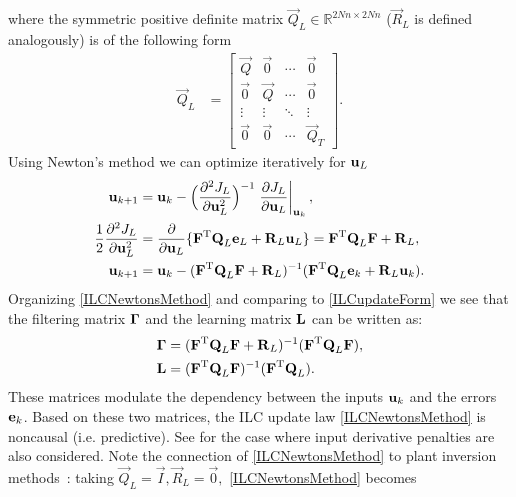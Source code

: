 \noindent where the symmetric positive definite matrix $\vec{Q}_L \in \mathbb{R}^{2Nn \times 2Nn}$ ($\vec{R}_L$ is defined analogously) is of the following form
%
\begin{equation}
\begin{aligned}
 \vec{Q}_L &= 
 \begin{bmatrix}
  \vec{Q} & \vec{0} & \cdots & \vec{0} \\
  \vec{0} & \vec{Q} & \cdots & \vec{0} \\
  \vdots  & \vdots  & \ddots & \vdots  \\
  \vec{0} & \vec{0} & \cdots & \vec{Q}_T
 \end{bmatrix}.
\end{aligned}
\label{Qmatrix}
\end{equation}
%
\noindent Using Newton's method we can optimize iteratively for $\boldsymbol{\mathrm{u}}_L$
%
\begin{equation}
\begin{aligned}
\boldsymbol{\mathrm{u}}_{k+1} &= \boldsymbol{\mathrm{u}}_k - \Big(\frac{\partial^{2}J_L}{\partial\boldsymbol{\mathrm{u}}^{2}_L}\Big)^{-1}\left.\frac{\partial{J_L}}{\partial{\boldsymbol{\mathrm{u}}_L}}\right|_{\boldsymbol{\mathrm{u}}_k}, \\
\frac{1}{2}\frac{\partial^{2}J_L}{\partial\boldsymbol{\mathrm{u}}^{2}_L} &= \frac{\partial}{\partial\boldsymbol{\mathrm{u}}_L}\{\boldsymbol{\mathrm{F}}^{\mathrm{T}}\boldsymbol{\mathrm{Q}}_L\boldsymbol{\mathrm{e}}_L + \boldsymbol{\mathrm{R}}_L\boldsymbol{\mathrm{u}}_L\} = \boldsymbol{\mathrm{F}}^{\mathrm{T}}\boldsymbol{\mathrm{Q}}_L\boldsymbol{\mathrm{F}} + \boldsymbol{\mathrm{R}}_L, \\
\boldsymbol{\mathrm{u}}_{k+1} &= \boldsymbol{\mathrm{u}}_k - (\boldsymbol{\mathrm{F}}^{\mathrm{T}}\boldsymbol{\mathrm{Q}}_L\boldsymbol{\mathrm{F}} + \boldsymbol{\mathrm{R}}_L)^{-1}(\boldsymbol{\mathrm{F}}^{\mathrm{T}}\boldsymbol{\mathrm{Q}}_L\boldsymbol{\mathrm{e}}_k + \boldsymbol{\mathrm{R}}_L\boldsymbol{\mathrm{u}}_k).
\end{aligned}
\label{ILCNewtonsMethod}
\end{equation}
%
\noindent Organizing \eqref{ILCNewtonsMethod} and comparing to \eqref{ILCupdateForm} we see that the filtering matrix $\boldsymbol{\mathrm{\Gamma}}$ and the learning matrix $\boldsymbol{\mathrm{L}}$ can be written as:
%
\begin{equation}
\begin{aligned}
\boldsymbol{\mathrm{\Gamma}} &= (\boldsymbol{\mathrm{F}}^{\mathrm{T}}\boldsymbol{\mathrm{Q}}_L\boldsymbol{\mathrm{F}} + \boldsymbol{\mathrm{R}}_L)^{-1}(\boldsymbol{\mathrm{F}}^{\mathrm{T}}\boldsymbol{\mathrm{Q}}_L\boldsymbol{\mathrm{F}}),\\
\boldsymbol{\mathrm{L}} &= (\boldsymbol{\mathrm{F}}^{\mathrm{T}}\boldsymbol{\mathrm{Q}}_L\boldsymbol{\mathrm{F}})^{-1}(\boldsymbol{\mathrm{F}}^{\mathrm{T}}\boldsymbol{\mathrm{Q}}_L).
\end{aligned}
\label{qAndlMatrices}
\end{equation}
%
\noindent These matrices modulate the dependency between the inputs $\boldsymbol{\mathrm{u}}_k$ and the errors $\boldsymbol{\mathrm{e}}_k$. Based on these two matrices, the ILC update law \eqref{ILCNewtonsMethod} is noncausal (i.e. predictive). See \cite{Amann95,Gunnarsson01} for the case where input derivative penalties are also considered. Note the connection of \eqref{ILCNewtonsMethod} to plant inversion methods~\cite{Bristow06}: taking $\vec{Q}_L = \vec{I}, \vec{R}_{L} = \vec{0},$ \eqref{ILCNewtonsMethod} becomes
